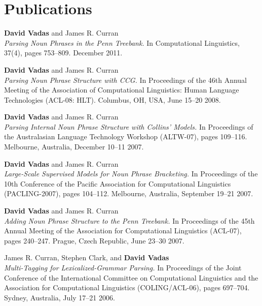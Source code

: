 \documentclass[]{article}
\begin{document}
\newpage

\section*{Publications}

\textbf{David Vadas} and James R. Curran\\
\textit{Parsing Noun Phrases in the Penn Treebank.}
In Computational Linguistics, 37(4), pages 753--809.
December 2011.

\vbox{}

\textbf{David Vadas} and James R. Curran\\
\textit{Parsing Noun Phrase Structure with {CCG}.}
In Proceedings of the 46th Annual Meeting of the Association of Computational
Linguistics: Human Language Technologies (ACL-08: HLT).
Columbus, OH, USA, June 15--20 2008.

\vbox{}

\textbf{David Vadas} and James R. Curran\\
\textit{Parsing Internal Noun Phrase Structure with Collins' Models.}
In Proceedings of the Australasian Language Technology 
Workshop (ALTW-07), pages 109--116. Melbourne, Australia, December 10--11 2007.

\vbox{}

\textbf{David Vadas} and James R. Curran\\
\textit{Large-Scale Supervised Models for Noun Phrase Bracketing.}
In Proceedings of the 10th Conference of the Pacific Association for 
Computational Linguistics (PACLING-2007), pages 104--112. 
Melbourne, Australia, September 19--21 2007.

\vbox{}

\textbf{David Vadas} and James R. Curran\\
\textit{Adding Noun Phrase Structure to the Penn Treebank.} In
Proceedings of the 45th Annual Meeting of the Association for Computational 
Linguistics (ACL-07), pages 240--247. Prague, Czech Republic, June 23--30 2007. \\
 
\vbox{}

James R. Curran, Stephen Clark, and \textbf{David Vadas}\\
\textit{Multi-Tagging for Lexicalized-Grammar Parsing.} In
Proceedings of the Joint Conference of the International Committee on
Computational Linguistics and the Association for Computational Linguistics
(COLING/ACL-06), pages 697--704. Sydney, Australia, July 17--21 2006. \\  
\end{document}
